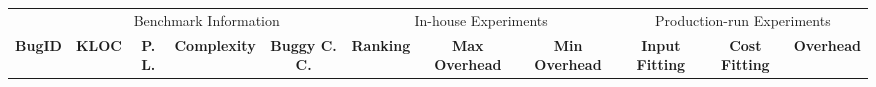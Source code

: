 \begin{table*}[h!]
  \centering
  \scriptsize
  {
  \newcommand{\Yes}[1]{\checkmark{}$_#1$}
  \newcommand{\No}[0]{-}
  {
  \begin{tabular}{lcccc|ccc|ccc}
    \toprule
        & \multicolumn{4}{c}{Benchmark Information} & \multicolumn{3}{c}{In-house Experiments} & \multicolumn{3}{c}{Production-run Experiments}   \\

    \cmidrule(lr){2-5}
    \cmidrule(lr){6-8}
    \cmidrule(lr){9-11}
    {\bf BugID}    & {\bf KLOC} & {\bf P. L.} & {\bf Complexity} & {\bf Buggy C. C.} & {\bf Ranking} & {\bf Max Overhead} & {\bf Min Overhead} & {\bf Input Fitting} & {\bf Cost Fitting}& {\bf Overhead} \\
    \midrule


\end{tabular}}}
\end{table*}
